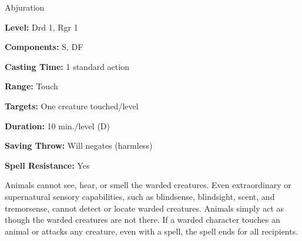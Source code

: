 
Abjuration

\textbf{Level:} Drd 1, Rgr 1

\textbf{Components:} S, DF

\textbf{Casting Time:} 1 standard action

\textbf{Range:} Touch

\textbf{Targets:} One creature touched/level

\textbf{Duration:} 10 min./level (D)

\textbf{Saving Throw:} Will negates (harmless)

\textbf{Spell Resistance:} Yes

Animals cannot see, hear, or smell the warded creatures. Even extraordinary or 
supernatural sensory capabilities, such as blindsense, blindsight, scent, and tremorsense, 
cannot detect or locate warded creatures. Animals simply act as though the warded 
creatures are not there. If a warded character touches an animal or attacks any 
creature, even with a spell, the spell ends for all recipients.

